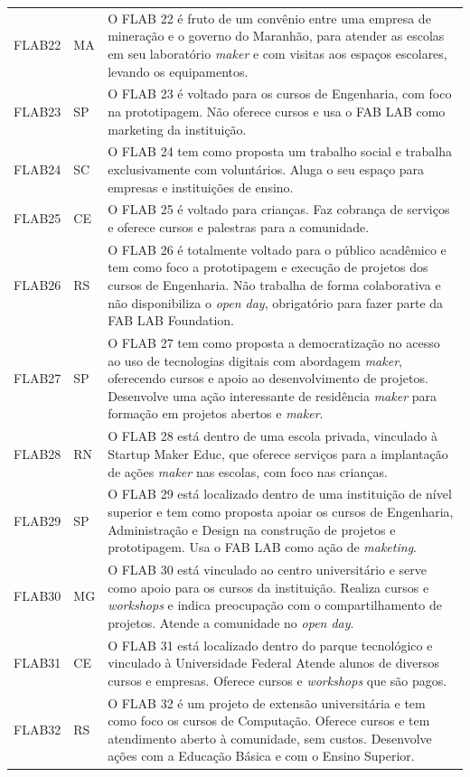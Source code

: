 \documentclass[portuguese]{textolivre}
\begin{document}
\begin{footnotesize}
\begin{longtable}{p{1cm} p{1cm} p{11.5cm}}
FLAB22 & MA & O FLAB 22 é fruto de um convênio entre uma empresa de mineração e o governo do Maranhão, para atender as escolas em seu laboratório \textit{maker} e com visitas aos espaços escolares, levando os equipamentos. \\
FLAB23 & SP & O FLAB 23 é voltado para os cursos de Engenharia, com foco na prototipagem. Não oferece cursos e usa o FAB LAB como marketing da instituição. \\
FLAB24 & SC & O FLAB 24 tem como proposta um trabalho social e trabalha exclusivamente com voluntários. Aluga o seu espaço para empresas e instituições de ensino. \\
FLAB25 & CE & O FLAB 25 é voltado para crianças. Faz cobrança de serviços e oferece cursos e palestras para a comunidade. \\
FLAB26 & RS & O FLAB 26 é totalmente voltado para o público acadêmico e tem como foco a prototipagem e execução de projetos dos cursos de Engenharia. Não trabalha de forma colaborativa e não disponibiliza o \textit{open day}, obrigatório para fazer parte da FAB LAB Foundation. \\
FLAB27 & SP & O FLAB 27 tem como proposta a democratização no acesso ao uso de tecnologias digitais com abordagem \textit{maker}, oferecendo cursos e apoio ao desenvolvimento de projetos. Desenvolve uma ação interessante de residência \textit{maker} para formação em projetos abertos e \textit{maker}. \\
FLAB28 & RN & O FLAB 28 está dentro de uma escola privada, vinculado à Startup Maker Educ, que oferece serviços para a implantação de ações \textit{maker} nas escolas, com foco nas crianças. \\
FLAB29 & SP & O FLAB 29 está localizado dentro de uma instituição de nível superior e tem como proposta apoiar os cursos de Engenharia, Administração e Design na construção de projetos e prototipagem. Usa o FAB LAB como ação de \textit{maketing}. \\
FLAB30 & MG & O FLAB 30 está vinculado ao centro universitário e serve como apoio para os cursos da instituição. Realiza cursos e \textit{workshops} e indica preocupação com o compartilhamento de projetos. Atende a comunidade no \textit{open day}. \\
FLAB31 & CE & O FLAB 31 está localizado dentro do parque tecnológico e vinculado à Universidade Federal Atende alunos de diversos cursos e empresas. Oferece cursos e \textit{workshops} que são pagos. \\
FLAB32 & RS & O FLAB 32 é um projeto de extensão universitária e tem como foco os cursos de Computação. Oferece cursos e tem atendimento aberto à comunidade, sem custos. Desenvolve ações com a Educação Básica e com o Ensino Superior. \\

\end{longtable}
\end{footnotesize}
\end{document}
